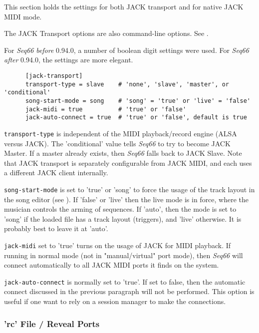    This section holds the settings for both JACK transport and for native JACK
   MIDI mode.

   The JACK Transport options are also command-line options.
   See .

   For \textsl{Seq66} \textsl{before} 0.94.0, a number of boolean digit settings
   were used.
   For \textsl{Seq66} \textsl{after} 0.94.0, the settings are more elegant.

   \begin{verbatim}
      [jack-transport]
      transport-type = slave    # 'none', 'slave', 'master', or 'conditional'
      song-start-mode = song    # 'song' = 'true' or 'live' = 'false'
      jack-midi = true          # 'true' or 'false'
      jack-auto-connect = true  # 'true' or 'false', default is true
   \end{verbatim}

   \texttt{transport-type} is independent of the MIDI playback/record engine
   (ALSA versus JACK). The 'conditional' value tells \textsl{Seq66} to try to
   become JACK Master.  If a master already exists, then \textsl{Seq66} falls
   back to JACK Slave.
   Note that JACK transport is separately configurable from
   JACK MIDI, and each uses a different JACK client internally.

   \texttt{song-start-mode} is set to 'true' or 'song' to force the usage of the
   track layout in the song editor (see ).
   If 'false' or 'live' then the live mode is in force, where the musician
   controls the arming of sequences.
   If 'auto', then the mode is set to 'song' if the loaded file has
   a track layout (triggers), and 'live' otherwise.
   It is probably best to leave it at 'auto'.

   \texttt{jack-midi} set to 'true' turns on the usage of JACK for MIDI
   playback.  If running in normal mode (not in "manual/virtual" port mode),
   then \textsl{Seq66} will connect automatically to all JACK MIDI ports it
   finds on the system.

   \texttt{jack-auto-connect} is normally set to 'true'.  If set to false, then
   the automatic connect discussed in the previous paragraph will not be
   performed.
   This option is useful if one want to rely on a session manager to make the
   connections.

\subsubsection{'rc' File / Reveal Ports}
\label{subsubsec:configuration_rc_reveal_ports}

